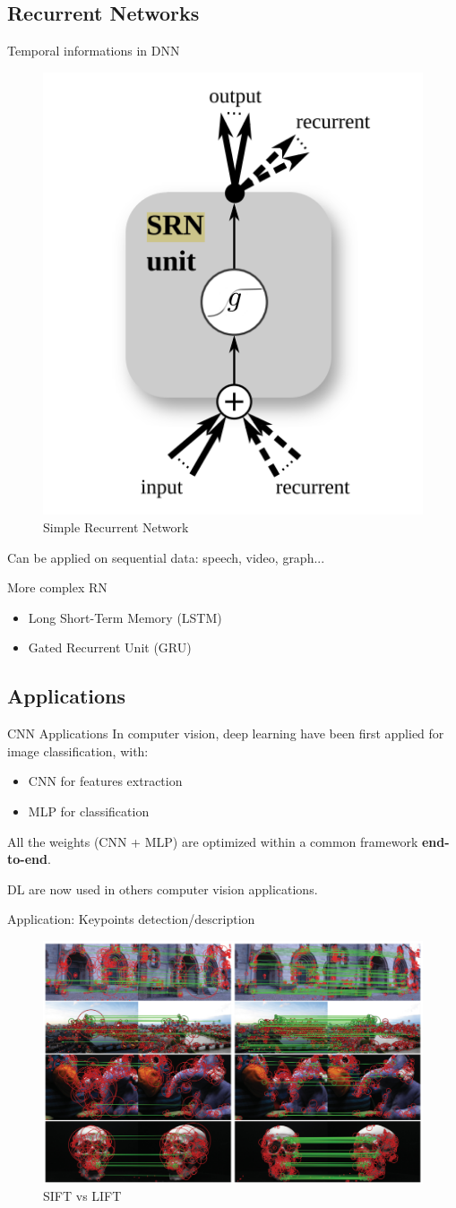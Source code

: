 \subsection{Recurrent Networks}
\begin{frame}{Temporal informations in DNN}
	\begin{figure}
		\includegraphics[width=0.2\linewidth]{images/srn.png}
		\caption{Simple Recurrent Network}
	\end{figure}

	Can be applied on sequential data: speech, video, graph...
	
	\begin{block}{More complex RN}
		\begin{itemize}
			\item Long Short-Term Memory (LSTM)
			\item Gated Recurrent Unit (GRU)
		\end{itemize}	
	\end{block}
\end{frame}

\subsection{Applications}
\begin{frame}{CNN Applications}
	In computer vision, deep learning have been first applied for image classification, with:
	\begin{itemize}
		\item CNN for features extraction
		\item MLP for classification
	\end{itemize}
	All the weights (CNN + MLP) are optimized within a common framework \textbf{end-to-end}.
	
	DL are now used in others computer vision applications.
\end{frame}

\begin{frame}{Application: Keypoints detection/description}

	\begin{figure}
		\includegraphics[width=0.8\linewidth]{images/lift.png}
		\caption{SIFT vs LIFT}
	\end{figure}
	
	
	\cite{LIFT}
\end{frame}